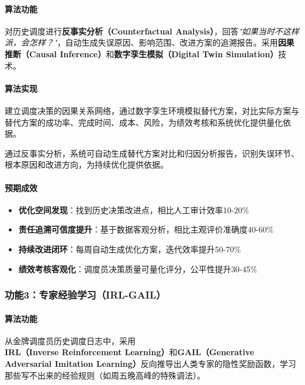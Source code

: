 \documentclass[12pt,a4paper]{article}
\begin{document}
\paragraph{算法功能}

对历史调度进行\textbf{反事实分析（Counterfactual Analysis）}，回答\textit{"如果当时不这样派，会怎样？"}，自动生成失误原因、影响范围、改进方案的追溯报告。采用\textbf{因果推断（Causal Inference）}和\textbf{数字孪生模拟（Digital Twin Simulation）}技术。

\paragraph{算法实现}

建立调度决策的因果关系网络，通过数字孪生环境模拟替代方案，对比实际方案与替代方案的成功率、完成时间、成本、风险，为绩效考核和系统优化提供量化依据。

通过反事实分析，系统可自动生成替代方案对比和归因分析报告，识别失误环节、根本原因和改进方向，为持续优化提供依据。

\paragraph{预期成效}

\begin{itemize}[leftmargin=*]
    \item[\checkmark] \textbf{优化空间发现}：找到历史决策改进点，相比人工审计效率10-20\%
    \item[\checkmark] \textbf{责任追溯可信度提升}：基于数据客观分析，相比主观评价准确度40-60\%
    \item[\checkmark] \textbf{持续改进闭环}：每周自动生成优化方案，迭代效率提升50-70\%
    \item[\checkmark] \textbf{绩效考核客观化}：调度员决策质量可量化评分，公平性提升30-45\%
\end{itemize}

\subsubsection{功能3：专家经验学习（IRL-GAIL）}

\paragraph{算法功能}

从金牌调度员历史调度日志中，采用\textbf{IRL（Inverse Reinforcement Learning）}和\textbf{GAIL（Generative Adversarial Imitation Learning）}反向推导出人类专家的隐性奖励函数，学习那些写不出来的经验规则（如周五晚高峰的特殊调法）。
\end{document}
